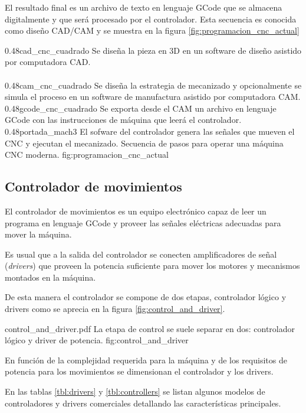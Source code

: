    El resultado final es un archivo de texto en lenguaje GCode que se almacena digitalmente y que será procesado por el controlador. Esta secuencia es conocida como diseño CAD/CAM y se muestra en la figura \ref{fig:programacion_cnc_actual}

\subfigtwotwo 
            {0.48}{cad_cnc_cuadrado}   {Se diseña la pieza en 3D en un software de diseño asistido por computadora CAD.\\ \vphantom{1}\\ \vphantom{1}}
            {0.48}{cam_cnc_cuadrado}   {Se diseña la estrategia de mecanizado y opcionalmente se simula el proceso en un software de manufactura asistido por computadora CAM.}
            {0.48}{gcode_cnc_cuadrado} {Se exporta desde el CAM un archivo en lenguaje GCode con las instrucciones de máquina que leerá el controlador.}
            {0.48}{portada_mach3}      {El sofware del controlador genera las señales que mueven el CNC y ejecutan el mecanizado.}
            {Secuencia de pasos para operar una máquina CNC moderna.}
            {fig:programacion_cnc_actual}

\subsection{Controlador de movimientos}
El controlador de movimientos es un equipo electrónico capaz de leer un programa en lenguaje GCode y proveer las señales eléctricas adecuadas para mover la máquina.\par
Es usual que a la salida del controlador se conecten amplificadores de señal (\textit{drivers}) que proveen la potencia suficiente para mover los motores y mecanismos montados en la máquina.\par
De esta manera el controlador se compone de dos etapas, controlador lógico y drivers como se aprecia en la figura \ref{fig:control_and_driver}.

         {control_and_driver.pdf}
         {La etapa de control se suele separar en dos: controlador lógico y driver de potencia.}
         {fig:control_and_driver}

En función de la complejidad requerida para la máquina y de los requisitos de potencia para los movimientos se dimensionan el controlador y los drivers.\par
En las tablas \ref{tbl:drivers} y \ref{tbl:controllers} se listan algunos modelos de controladores y drivers comerciales detallando las características principales.

